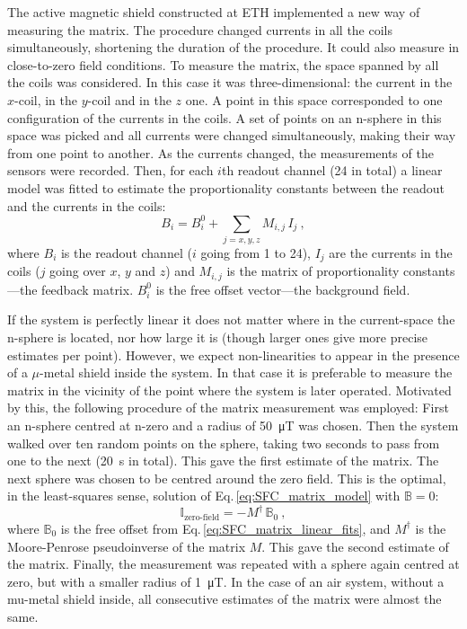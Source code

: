 The active magnetic shield constructed at ETH implemented a new way of measuring the matrix.
The procedure changed currents in all the coils simultaneously, shortening the duration of the procedure.
It could also measure in close-to-zero field conditions.
To measure the matrix, the space spanned by all the coils was considered.
In this case it was three-dimensional: the current in the $x$-coil, in the $y$-coil and in the $z$ one.
A point in this space corresponded to one configuration of the currents in the coils.
A set of points on an n-sphere in this space was picked and all currents were changed simultaneously, making their way from one point to another.
As the currents changed, the measurements of the sensors were recorded.
Then, for each $i$th readout channel (24 in total) a linear model was fitted to estimate the proportionality constants between the readout and the currents in the coils:
\begin{equation}
  \label{eq:SFC_matrix_linear_fits}
  B_i = B_i^0 + \sum_{j=x,y,z} M_{i,j} \, I_j \ ,
\end{equation}
where $B_i$ is the readout channel ($i$ going from 1 to 24), $I_j$ are the currents in the coils ($j$ going over $x$, $y$ and $z$) and $M_{i,j}$ is the matrix of proportionality constants---the feedback matrix.
$B_i^0$ is the free offset vector---the background field.

If the system is perfectly linear it does not matter where in the current-space the n-sphere is located, nor how large it is (though larger ones give more precise estimates per point).
However, we expect non-linearities to appear in the presence of a $\mu$-metal shield inside the system.
In that case it is preferable to measure the matrix in the vicinity of the point where the system is later operated.
Motivated by this, the following procedure of the matrix measurement was employed:
First an n-sphere centred at n-zero and a radius of \SI{50}{\micro\tesla} was chosen.
Then the system walked over ten random points on the sphere, taking two seconds to pass from one to the next (\SI{20}{\second} in total).
This gave the first estimate of the matrix.
The next sphere was chosen to be centred around the zero field. This is the optimal, in the least-squares sense, solution of Eq.\,\ref{eq:SFC_matrix_model} with $\mathbb{B} = 0$:
\begin{equation}
  \label{eq:SFC_zero_field_requirement}
  \mathbb{I}_\text{zero-field} = - M^\dagger \, \mathbb{B}_0 \ ,
\end{equation}
where $\mathbb{B}_0$ is the free offset from Eq.\,\ref{eq:SFC_matrix_linear_fits}, and $M^\dagger$ is the Moore-Penrose pseudoinverse of the matrix $M$.
This gave the second estimate of the matrix.
Finally, the measurement was repeated with a sphere again centred at zero, but with a smaller radius of \SI{1}{\micro\tesla}.
In the case of an air system, without a mu-metal shield inside, all consecutive estimates of the matrix were almost the same.

